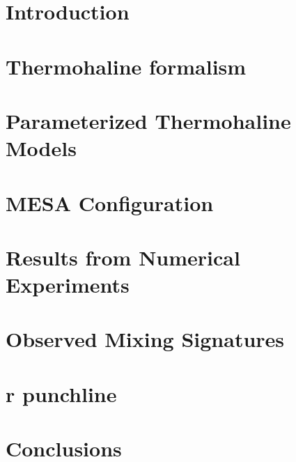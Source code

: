 \documentclass[linenumbers,twocolumn]{aastex62}
\begin{document}

\section{Introduction}
\label{sec:intro}
\setcounter{footnote}{0}



\section{Thermohaline formalism}
\label{sec:formalism}



\section{Parameterized Thermohaline Models}
\label{sec:parameterizations}




\section{MESA Configuration}
\label{sec:mesa_experiment}



\section{Results from Numerical Experiments}
\label{sec:mesa_results}



\section{Observed Mixing Signatures} 
\label{sec:obs}



\section{r punchline} 
\label{sec:punchline}



\section{Conclusions}
\label{sec:conclusions}

\end{document}
